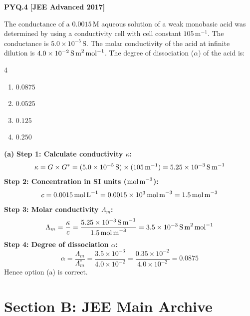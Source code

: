 \begin{problembox}
\textbf{PYQ.4} \hfill \textbf{[JEE Advanced 2017]}

The conductance of a $0.0015\,\text{M}$ aqueous solution of a weak monobasic acid was determined by using a conductivity cell with cell constant $105\,\text{m}^{-1}$. The conductance is $5.0 \times 10^{-5}\,\text{S}$. The molar conductivity of the acid at infinite dilution is $4.0 \times 10^{-2}\,\text{S\,m}^2\,\text{mol}^{-1}$. The degree of dissociation ($\alpha$) of the acid is:
\begin{multicols}{4}
\begin{enumerate}[label=(\alph*)]
    \item $0.0875$
    \item $0.0525$
    \item $0.125$
    \item $0.250$
\end{enumerate}
\end{multicols}
\end{problembox}
\begin{solution}
\textbf{(a)}
\textbf{Step 1: Calculate conductivity $\kappa$:}
\begin{equation*}
    \kappa = G \times G^* = (5.0 \times 10^{-5}\,\text{S}) \times (105\,\text{m}^{-1}) = 5.25 \times 10^{-3}\,\text{S\,m}^{-1}
\end{equation*}
\textbf{Step 2: Concentration in SI units ($\text{mol\,m}^{-3}$):}
\begin{equation*}
    c = 0.0015\,\text{mol\,L}^{-1} = 0.0015 \times 10^3\,\text{mol\,m}^{-3} = 1.5\,\text{mol\,m}^{-3}
\end{equation*}
\textbf{Step 3: Molar conductivity $\Lambda_m$:}
\begin{equation*}
    \Lambda_m = \frac{\kappa}{c} = \frac{5.25 \times 10^{-3}\,\text{S\,m}^{-1}}{1.5\,\text{mol\,m}^{-3}} = 3.5 \times 10^{-3}\,\text{S\,m}^2\,\text{mol}^{-1}
\end{equation*}
\textbf{Step 4: Degree of dissociation $\alpha$:}
\begin{equation*}
    \alpha = \frac{\Lambda_m}{\Lambda_m^\circ} = \frac{3.5 \times 10^{-3}}{4.0 \times 10^{-2}} = \frac{0.35 \times 10^{-2}}{4.0 \times 10^{-2}} = 0.0875
\end{equation*}
Hence option (a) is correct.
\end{solution}

\vspace{0.5cm}
\section*{Section B: JEE Main Archive}

